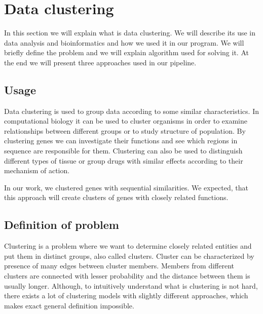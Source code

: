 \section{Data clustering}
In this section we will explain what is data clustering.
We will describe its use in data analysis and bioinformatics and how we used it in our program.
We will briefly define the problem and we will explain algorithm used for solving it.
At the end we will present three approaches used in our pipeline.

\subsection{Usage}
Data clustering is used to group data according to some similar characteristics.
In computational biology it can be used to cluster organisms in order to examine relationships between different groups or to study structure of population.
By clustering genes we can investigate their functions and see which regions in sequence are responsible for them.
Clustering can also be used to distinguish different types of tissue or group drugs with similar effects according to their mechanism of action.

In our work, we clustered genes with sequential similarities.
We expected, that this approach will create clusters of genes with closely related functions.

\subsection{Definition of problem}
Clustering is a problem where we want to determine closely related entities and put them in distinct groups, also called clusters.
Cluster can be characterized by presence of many edges between cluster members.
Members from different clusters are connected with lesser probability and the distance between them is usually longer.
Although, to intuitively understand what is clustering is not hard, there exists a lot of clustering models with slightly different approaches, which makes exact general definition impossible.  

